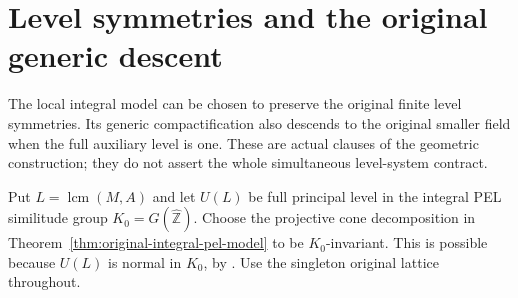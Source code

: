 \section{Level symmetries and the original generic descent}
\label{sec:pel-level-symmetry}

The local integral model can be chosen to preserve the original finite
level symmetries.  Its generic compactification also descends to the
original smaller field when the full auxiliary level is one.  These
are actual clauses of the geometric construction; they do not assert
the whole simultaneous level-system contract.

Put $L=\operatorname{lcm}(M,A)$ and let $U(L)$ be full principal
level in the integral PEL similitude group $K_0=G(\widehat{\mathbb Z})$.
Choose the projective cone decomposition in
Theorem~\ref{thm:original-integral-pel-model} to be $K_0$-invariant.
This is possible because $U(L)$ is normal in $K_0$, by
\cite[Proposition 2.8(2)]{level-symmetry-lan-cones}.
Use the singleton original lattice throughout.

